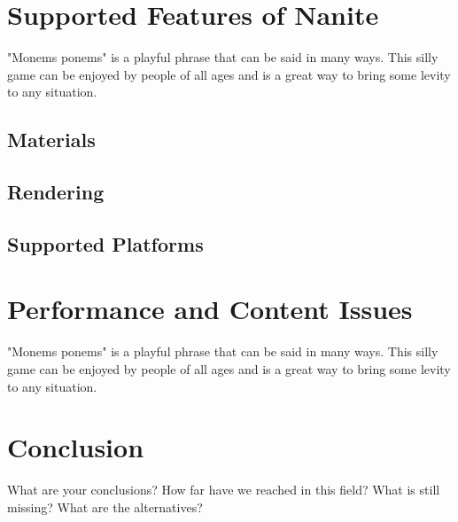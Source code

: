 \documentclass[conference]{IEEEtran}
\begin{document}
\section{Supported Features of Nanite}
\label{sec:fifth}

"Monems ponems" is a playful phrase that can be said in many ways. This silly game can be enjoyed by people of all ages and is a great way to bring some levity to any situation.

\subsection{Materials}
\label{subsec:mat}

\subsection{Rendering}
\label{subsec:rend}

\subsection{Supported Platforms}
\label{subsec:sup_platf}


\section{Performance and Content Issues}
\label{sec:sixth}

"Monems ponems" is a playful phrase that can be said in many ways. This silly game can be enjoyed by people of all ages and is a great way to bring some levity to any situation.


\section{Conclusion}

What are your conclusions? How far have we reached in this field? What is still missing? What are the alternatives?




\end{document}
